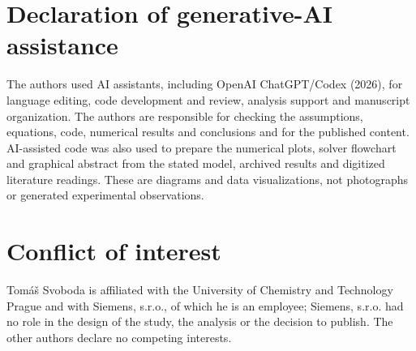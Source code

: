 \documentclass[11pt]{article}
\begin{document}
\section*{Declaration of generative-AI assistance}
The authors used AI assistants, including OpenAI ChatGPT/Codex (2026), for
language editing, code development and
review, analysis support and manuscript organization. The authors are
responsible for checking the assumptions, equations, code, numerical results
and conclusions and for the published content.
AI-assisted code was also used to prepare the numerical plots, solver
flowchart and graphical abstract from the stated model, archived results
and digitized literature readings. These are diagrams and data
visualizations, not photographs or generated experimental observations.

\section*{Conflict of interest}
Tom\'a\v{s} Svoboda is affiliated with the University of Chemistry and
Technology Prague and with Siemens, s.r.o., of which he is an employee;
Siemens, s.r.o. had no role in the design of the study, the analysis or
the decision to publish. The other authors declare no competing interests.
\end{document}
